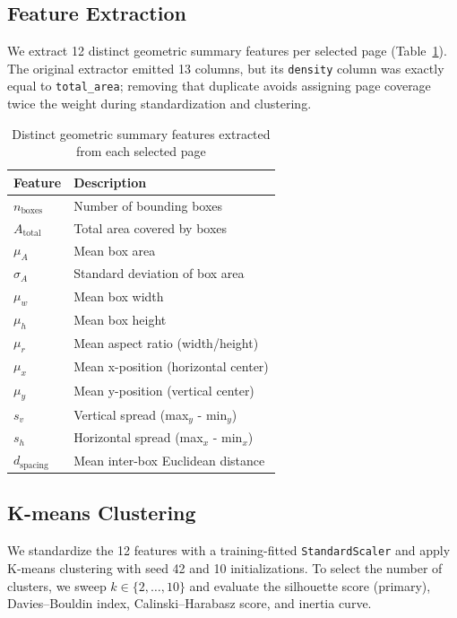 \subsection{Feature Extraction}
\label{subsec:features}

We extract 12 distinct geometric summary features per selected page (Table~\ref{tab:features}). The original extractor emitted 13 columns, but its \texttt{density} column was exactly equal to \texttt{total\_area}; removing that duplicate avoids assigning page coverage twice the weight during standardization and clustering.

\begin{table}[h]
\centering
\caption{Distinct geometric summary features extracted from each selected page}
\label{tab:features}
\begin{tabular}{@{}ll@{}}
\toprule
\textbf{Feature} & \textbf{Description} \\ \midrule
$n_{\text{boxes}}$ & Number of bounding boxes \\
$A_{\text{total}}$ & Total area covered by boxes \\
$\mu_A$ & Mean box area \\
$\sigma_A$ & Standard deviation of box area \\
$\mu_w$ & Mean box width \\
$\mu_h$ & Mean box height \\
$\mu_r$ & Mean aspect ratio (width/height) \\
$\mu_x$ & Mean x-position (horizontal center) \\
$\mu_y$ & Mean y-position (vertical center) \\
$s_v$ & Vertical spread (max$_y$ - min$_y$) \\
$s_h$ & Horizontal spread (max$_x$ - min$_x$) \\
$d_{\text{spacing}}$ & Mean inter-box Euclidean distance \\ \bottomrule
\end{tabular}
\end{table}

\subsection{K-means Clustering}
\label{subsec:kmeans}

We standardize the 12 features with a training-fitted \texttt{StandardScaler} and apply K-means clustering \cite{kmeans} with seed 42 and 10 initializations. To select the number of clusters, we sweep $k \in \{2,\dots,10\}$ and evaluate the silhouette score (primary), Davies--Bouldin index, Calinski--Harabasz score, and inertia curve.

